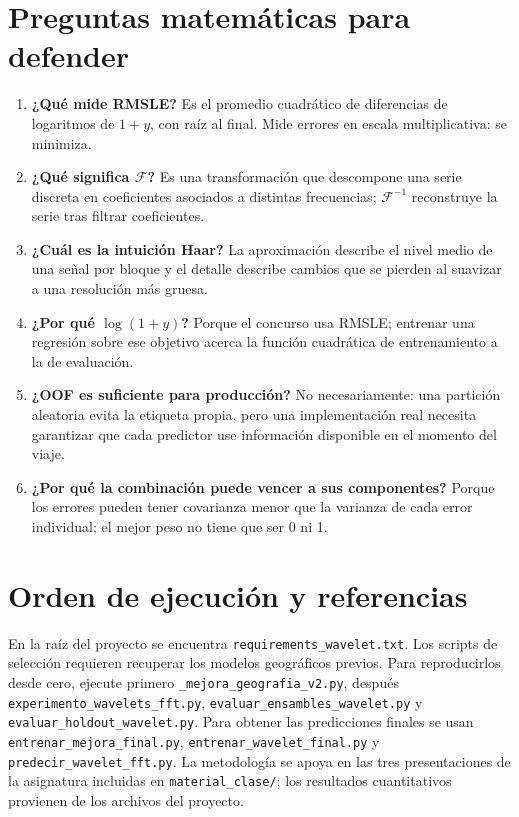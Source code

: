 \documentclass[11pt,letterpaper]{article}
\begin{document}
\section*{Preguntas matemáticas para defender}
\begin{enumerate}
\item \textbf{¿Qué mide RMSLE?} Es el promedio cuadrático de diferencias de logaritmos de \(1+y\), con raíz al final. Mide errores en escala multiplicativa: se minimiza.
\item \textbf{¿Qué significa \(\mathcal F\)?} Es una transformación que descompone una serie discreta en coeficientes asociados a distintas frecuencias; \(\mathcal F^{-1}\) reconstruye la serie tras filtrar coeficientes.
\item \textbf{¿Cuál es la intuición Haar?} La aproximación describe el nivel medio de una señal por bloque y el detalle describe cambios que se pierden al suavizar a una resolución más gruesa.
\item \textbf{¿Por qué \(\log(1+y)\)?} Porque el concurso usa RMSLE; entrenar una regresión sobre ese objetivo acerca la función cuadrática de entrenamiento a la de evaluación.
\item \textbf{¿OOF es suficiente para producción?} No necesariamente: una partición aleatoria evita la etiqueta propia, pero una implementación real necesita garantizar que cada predictor use información disponible en el momento del viaje.
\item \textbf{¿Por qué la combinación puede vencer a sus componentes?} Porque los errores pueden tener covarianza menor que la varianza de cada error individual; el mejor peso no tiene que ser 0 ni 1.
\end{enumerate}

\section*{Orden de ejecución y referencias}
En la raíz del proyecto se encuentra \texttt{requirements\_wavelet.txt}. Los scripts de selección requieren recuperar los modelos geográficos previos. Para reproducirlos desde cero, ejecute primero \texttt{\_mejora\_geografia\_v2.py}, después \texttt{experimento\_wavelets\_fft.py}, \texttt{evaluar\_ensambles\_wavelet.py} y \texttt{evaluar\_holdout\_wavelet.py}. Para obtener las predicciones finales se usan \texttt{entrenar\_mejora\_final.py}, \texttt{entrenar\_wavelet\_final.py} y \texttt{predecir\_wavelet\_fft.py}. La metodología se apoya en las tres presentaciones de la asignatura incluidas en \texttt{material\_clase/}; los resultados cuantitativos provienen de los archivos del proyecto.
\end{document}
